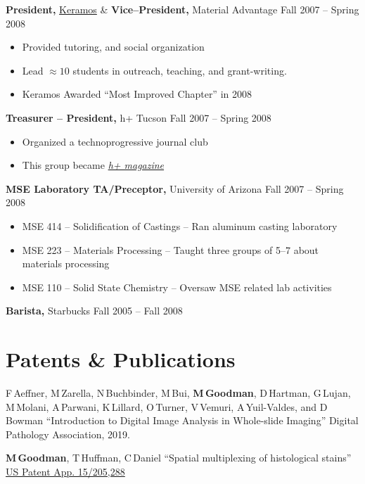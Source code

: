 \documentclass{res}
\begin{document}
\begin{resume}
{\bf President,} \href{https://ceramics.org/members/member-communities/classes/keramos}{Keramos} \& {\bf Vice--President,} Material Advantage \hfill Fall 2007 -- Spring 2008
\begin{itemize} \itemsep -2pt
  \item Provided tutoring, and social organization
  \item Lead $\approx10$ students in outreach, teaching, and grant-writing.
  \item Keramos Awarded ``Most Improved Chapter'' in 2008
\end{itemize}

{\bf Treasurer -- President,} h+ Tucson \hfill Fall 2007 -- Spring 2008
\begin{itemize} \itemsep -2pt
  \item Organized a technoprogressive journal club
  \item This group became \href{http://hplusmagazine.com/}{\textit{h+ magazine}}
\end{itemize}

{\bf MSE Laboratory TA/Preceptor,} University of Arizona \hfill Fall 2007 -- Spring 2008
\begin{itemize} \itemsep -2pt
  \item MSE 414 -- Solidification of Castings -- Ran aluminum casting laboratory
  \item MSE 223 -- Materials Processing -- Taught three groups of 5--7 about materials processing
  \item MSE 110 -- Solid State Chemistry -- Oversaw MSE related lab activities
\end{itemize}

{\bf Barista,} Starbucks \hfill Fall 2005 -- Fall 2008

\section{Patents \& Publications}

  F\,Aeffner, M\,Zarella, N\,Buchbinder, M\,Bui, \textbf{M\,Goodman}, 
  D\,Hartman, G\,Lujan, M\,Molani, A\,Parwani, K\,Lillard, O\,Turner,
  V\,Vemuri, A\,Yuil-Valdes, and D\,Bowman
  ``Introduction to Digital Image Analysis in Whole-slide Imaging''
  Digital Pathology Association, 2019.

  \textbf{M\,Goodman}, T\,Huffman, C\,Daniel
  ``Spatial multiplexing of histological stains''
  \href{https://patents.google.com/patent/US20170011511A1/en}{US Patent App. 15/205,288}


\end{resume}
\end{document}
